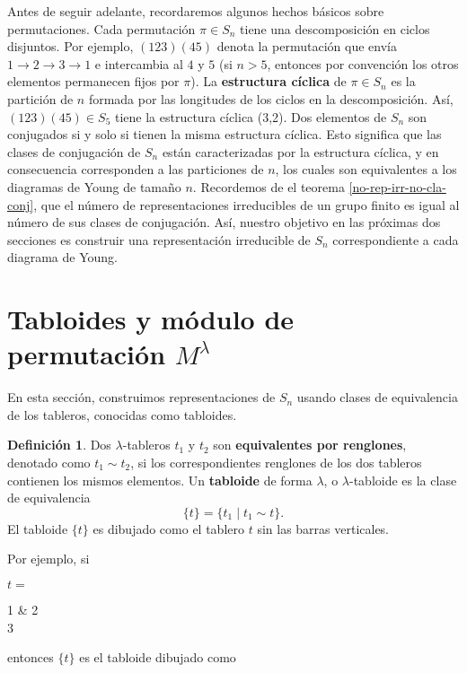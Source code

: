 \documentclass[12pt]{book}
\theoremstyle{definition}
\newtheorem{definition}[theorem]{Definición}
\newcounter{in}
\newcounter{ini}
\begin{document}
Antes de seguir adelante, recordaremos algunos hechos básicos
sobre permutaciones. Cada permutación $\pi \in S_{n}$ tiene una
descomposición en ciclos disjuntos. Por ejemplo, $(123)(45)$ denota la
permutación que envía $1\rightarrow 2 \rightarrow 3 \rightarrow 1$  e
intercambia al $4$ y $5$ (si $n>5$, entonces por convención los otros
elementos permanecen fijos por $\pi$). La \textbf{estructura cíclica} de $\pi\in S_{n}$ es la
partición de $n$ formada por las longitudes de los ciclos en la
descomposición. Así, $(123)(45)\in S_{5}$ tiene la estructura
cíclica (3,2). Dos elementos de $S_{n}$ son conjugados si y solo si
tienen la misma estructura cíclica. %
Esto significa que las clases de conjugación de $S_{n}$ están
caracterizadas por la estructura cíclica, y en consecuencia
corresponden a las particiones de $n$, los cuales son equivalentes a
los diagramas de Young de tamaño $n$. Recordemos de el teorema
\ref{no-rep-irr-no-cla-conj}, que el número de representaciones irreducibles de un
grupo finito es igual al número de sus clases de conjugación. Así,
nuestro objetivo en las próximas dos secciones es construir una
representación irreducible de $S_{n}$ correspondiente a cada diagrama
de Young.

\section{Tabloides y módulo de permutación $M^{\lambda}$}
\label{modulo-permutacion}

En esta sección, construimos representaciones de $S_{n}$ usando clases
de equivalencia de los tableros, conocidas como tabloides.

\begin{definition}
  Dos $\lambda$-tableros $t_{1}$ y $t_{2}$ son \textbf{equivalentes
    por renglones}, denotado como $t_{1}\sim t_{2}$, si los
  correspondientes renglones de los dos tableros contienen los mismos
  elementos. Un \textbf{tabloide} de forma $\lambda$, o
  $\lambda$-tabloide es la clase de equivalencia
  $$\{t\}=\{t_{1}\mid t_{1}\sim t\}.$$
  El tabloide $\{t\}$ es dibujado como el tablero $t$ sin las barras
  verticales.
\end{definition}
Por ejemplo, si
\begin{center}
  $t=$
  \begin{ytableau}
    1 & 2  \\
    3
  \end{ytableau}
\end{center}
entonces $\{t\}$ es el tabloide dibujado como
\end{document}
